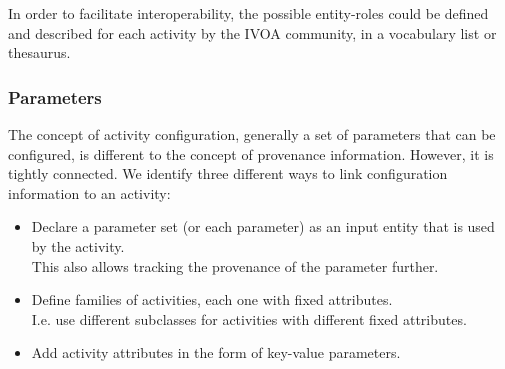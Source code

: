 In order to facilitate interoperability, the possible 
entity-roles could be defined and described for each activity by the IVOA community, in a 
vocabulary list or thesaurus.



%






\subsubsection{Parameters}\label{sec:parameters}

The concept of activity configuration, generally a set of parameters that can be configured, is different to the concept of provenance information. However, it is tightly connected. We identify three different ways to link configuration information to an activity:
\begin{itemize}
\item Declare a parameter set (or each parameter) as an input entity that is used by the activity. \\
        This also allows tracking the provenance of the parameter further.
\item Define families of activities, each one with fixed attributes.\\
        I.e. use different subclasses for activities with different fixed attributes.
\item Add activity attributes in the form of key-value parameters.
\end{itemize}

